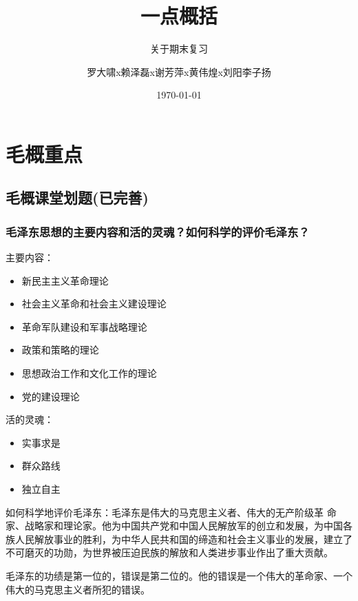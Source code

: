 \documentclass[cn,11pt]{elegantbook}
\title{一点概括}
\subtitle{关于期末复习}
\author{罗大啸x赖泽磊x谢芳萍x黄伟煌x刘阳李子扬}
\institute{luodaxiao}
\date{\today}
\begin{document}
\maketitle
\tableofcontents


\mainmatter
\hypersetup{pageanchor=true}

\chapter{毛概重点}
\section{毛概课堂划题(已完善)}
\subsection{毛泽东思想的主要内容和活的灵魂？如何科学的评价毛泽东？}
{\large 
	
{\heiti  主要内容：}

\begin{itemize}
	\item 新民主主义革命理论
	\item 社会主义革命和社会主义建设理论
	\item 革命军队建设和军事战略理论
	\item 政策和策略的理论
	\item 思想政治工作和文化工作的理论
	\item 党的建设理论 
\end{itemize}

{\heiti 活的灵魂：}
\begin{itemize}
	\item 实事求是
	\item 群众路线
	\item 独立自主
\end{itemize}

{\heiti 如何科学地评价毛泽东：}毛泽东是伟大的马克思主义者、伟大的无产阶级革
命家、战略家和理论家。他为中国共产党和中国人民解放军的创立和发展，为中国各族人民解放事业的胜利，为中华人民共和国的缔造和社会主义事业的发展，建立了不可磨灭的功勋，为世界被压迫民族的解放和人类进步事业作出了重大贡献。

毛泽东的功绩是第一位的，错误是第二位的。他的错误是一个伟大的革命家、一个伟大的马克思主义者所犯的错误。}
\end{document}
